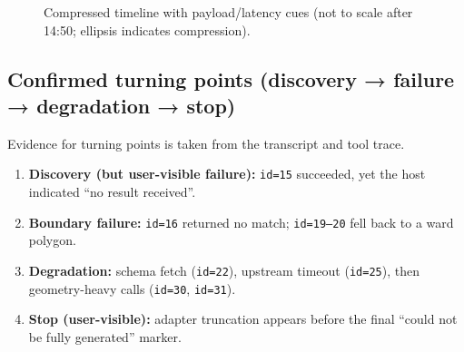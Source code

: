 \begin{figure}[ht]
{%
}
\caption{Compressed timeline with payload/latency cues (not to scale after 14:50; ellipsis indicates compression).}
\end{figure}

\subsection{Confirmed turning points (discovery → failure → degradation → stop)}

Evidence for turning points is taken from the transcript and tool trace. \cite{artefact_claude_stopped_after_ngd_features_2026_02_18,artefact_codex_trace_jsonl_2026_02_18}

\begin{enumerate}[leftmargin=*]
  \item \textbf{Discovery (but user-visible failure):} \texttt{id=15} succeeded, yet the host indicated “no result received”.
  \item \textbf{Boundary failure:} \texttt{id=16} returned no match; \texttt{id=19–20} fell back to a ward polygon.
  \item \textbf{Degradation:} schema fetch (\texttt{id=22}), upstream timeout (\texttt{id=25}), then geometry-heavy calls (\texttt{id=30}, \texttt{id=31}).
  \item \textbf{Stop (user-visible):} adapter truncation appears before the final “could not be fully generated” marker.
\end{enumerate}

